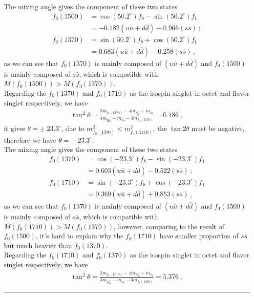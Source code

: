 \documentclass[12pt,twoside]{report}
\numberwithin{problemname}{chapter}
\newenvironment{solution}{\vspace{1em}\par\noindent{\large\textbf{\textsc{Solution}}}\par}{\vspace{1em}\hrule}
\begin{document}
\begin{solution}
\begin{enumerate}[1)]
    The mixing angle gives the component of these two states
    \begin{align}
        f_0(1500)&=\cos{(50.2^\circ)}f_8-\sin{(50.2^\circ)}f_1 \nonumber \\
        &=-0.182(u\bar{u}+d\bar{d})-0.966(s\bar{s})\ ; \\
        f_0(1370)&=\sin{(50.2^\circ)}f_8+\cos{(50.2^\circ)}f_1 \nonumber \\
        &=0.683(u\bar{u}+d\bar{d})-0.258(s\bar{s})\ ,
    \end{align}
    as we can see that $f_0(1370)$ is mainly composed of $(u\bar{u}+d\bar{d})$ and $f_0(1500)$ is mainly composed of $s\bar{s}$, which is compatible with $M(f_0(1500))>M(f_0(1370))$.\\
    Regarding the $f_0(1370)$ and $f_0(1710)$ as the isospin singlet in octet and flavor singlet respectively, we have
    \begin{align}
        \tan^2{\theta}=\frac{3m_{f_0(1370)}-4m_{K^*_0}+m_{a_0}}{4m_{K^*_0}-m_{a_0}-3m_{f_0(1710)}}=0.186\ ,
    \end{align}
    it gives $\theta=\pm ~23.3^\circ$, due to $m^2_{f_0(1370)}<m^2_{f_0(1710)}$, the $\tan{2\theta}$ must be negative, therefore we have $\theta=-~23.3^\circ$.\\
    The mixing angle gives the component of these two states
    \begin{align}
        f_0(1370)&=\cos{(-23.3^\circ)}f_8-\sin{(-23.3^\circ)}f_1 \nonumber \\
        &=0.603(u\bar{u}+d\bar{d})-0.522(s\bar{s})\ ; \\
        f_0(1710)&=\sin{(-23.3^\circ)}f_8+\cos{(-23.3^\circ)}f_1 \nonumber \\
        &=0.369(u\bar{u}+d\bar{d})+0.853(s\bar{s})\ ,
    \end{align}
    as we can see that $f_0(1370)$ is mainly composed of $(u\bar{u}+d\bar{d})$ and $f_0(1500)$ is mainly composed of $s\bar{s}$, which is compatible with $M(f_0(1710))>M(f_0(1370))$, however, comparing to the result of $f_0(1500)$, it's hard to explain why the $f_0(1710)$ have smaller proportion of $s\bar{s}$ but much heavier than $f_0(1370)$.\\
    Regarding the $f_0(1710)$ and $f_0(1370)$ as the isospin singlet in octet and flavor singlet respectively, we have
    \begin{align}
        \tan^2{\theta}=\frac{3m_{f_0(1710)}-4m_{K^*_0}+m_{a_0}}{4m_{K^*_0}-m_{a_0}-3m_{f_0(1370)}}=5.376\ ,
    \end{align}

\end{enumerate}
\end{solution}
\end{document}
